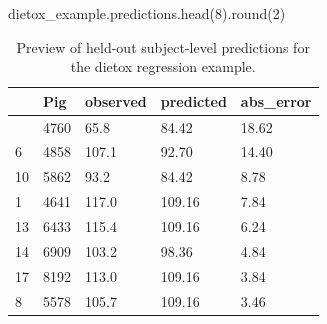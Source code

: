 \documentclass[
  letterpaper,
  DIV=11,
  numbers=noendperiod]{scrartcl}
\newenvironment{Shaded}{\begin{snugshade}}{\end{snugshade}}
\newcommand{\BuiltInTok}[1]{\textcolor[rgb]{0.00,0.23,0.31}{#1}}
\newcommand{\DecValTok}[1]{\textcolor[rgb]{0.68,0.00,0.00}{#1}}
\newcommand{\NormalTok}[1]{\textcolor[rgb]{0.00,0.23,0.31}{#1}}
\begin{document}
\begin{Shaded}
\begin{Highlighting}[]
\NormalTok{dietox\_example.predictions.head(}\DecValTok{8}\NormalTok{).}\BuiltInTok{round}\NormalTok{(}\DecValTok{2}\NormalTok{)}
\end{Highlighting}
\end{Shaded}

\begin{longtable}[]{@{}lllll@{}}

\caption{\label{tbl-dietox-predictions}Preview of held-out subject-level
predictions for the dietox regression example.}

\tabularnewline

\toprule\noalign{}
& Pig & observed & predicted & abs\_error \\
\midrule\noalign{}
\endhead
\bottomrule\noalign{}
\endlastfoot
4 & 4760 & 65.8 & 84.42 & 18.62 \\
6 & 4858 & 107.1 & 92.70 & 14.40 \\
10 & 5862 & 93.2 & 84.42 & 8.78 \\
1 & 4641 & 117.0 & 109.16 & 7.84 \\
13 & 6433 & 115.4 & 109.16 & 6.24 \\
14 & 6909 & 103.2 & 98.36 & 4.84 \\
17 & 8192 & 113.0 & 109.16 & 3.84 \\
8 & 5578 & 105.7 & 109.16 & 3.46 \\

\end{longtable}
\end{document}
